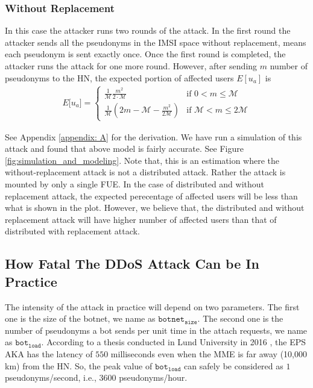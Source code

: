 \documentclass{llncs} %
\begin{document}
\subsubsection{Without Replacement}
In this case the attacker runs two rounds of the attack. In the first round the attacker sends all the pseudonyms in the IMSI space without replacement, means each pseudonym is sent exactly once. Once the first round is completed, the attacker runs the attack for one more round. However, after sending $m$ number of pseudonyms to the HN, the expected portion of affected users $E[u_a]$ is
\begin{eqnarray}
E\big[ u_a \big] = \begin{cases} \frac{1}{\mathcal{M}}\frac{m^2}{2\cdot \mathcal{M}} & \mbox{if } 0 < m \leq \mathcal{M} \\ 
\frac{1}{\mathcal{M}}(2m - \mathcal{M} - \frac{m^2}{2\mathcal{M}}) & \mbox{if } \mathcal{M} < m \leq 2\mathcal{M} \end{cases}
\label{eqn:without_replacement}
\end{eqnarray} 

See Appendix \ref{appendix: A} for the derivation. We have run a simulation of this attack and found that above model is fairly accurate. See Figure \ref{fig:simulation_and_modeling}. Note that, this is an estimation where the without-replacement attack is not a distributed attack. Rather the attack is mounted by only a single FUE. In the case of distributed and without replacement attack, the expected perecentage of affected users will be less than what is shown in the plot. However, we believe that, the distributed and without replacement attack will have higher number of affected users than that of distributed with replacement attack. %


\subsection{How Fatal The DDoS Attack Can be In Practice} \label{sec:how_fatal_ddos}
The intensity of the attack in practice will depend on two parameters. The first one is the size of the botnet, we name as $\texttt{botnet}_{\texttt{size}}$. The second one is the number of pseudonyms a bot sends per unit time in the attach requests, we name as $\texttt{bot}_{\texttt{load}}$. According to a thesis conducted in Lund University in 2016 \cite{thesislund}, the EPS AKA has the latency of $550$ milliseconds even when the MME is far away (10,000 km) from the HN. So, the peak value of $\texttt{bot}_{\texttt{load}}$ can safely be considered as $1$ pseudonyms/second, i.e., 3600 pseudonyms/hour.
\end{document}
